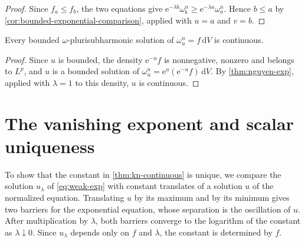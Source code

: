 \begin{proof}
Since $f_a\leq f_b$, the two equations give
$\mathrm{e}^{-\lambda b}\omega_b^n\geq \mathrm{e}^{-\lambda a}\omega_a^n$. Hence $b\leq a$ by \cref{cor:bounded-exponential-comparison}, applied with $u=a$ and $v=b$.
\end{proof}

\begin{corollary}\label{cor:bounded-lp-continuity}
Every bounded $\omega$-plurisubharmonic solution of $\omega_u^n=f\,\mathrm{d}V$ is continuous.
\end{corollary}
\begin{proof}
Since $u$ is bounded, the density $\mathrm{e}^{-u}f$ is nonnegative, nonzero and belongs to $L^p$, and $u$ is a bounded solution of $\omega_u^n=\mathrm{e}^{u}(\mathrm{e}^{-u}f)\,\mathrm{d}V$. By \cref{thm:nguyen-exp}, applied with $\lambda=1$ to this density, $u$ is continuous.
\end{proof}



\section{The vanishing exponent and scalar uniqueness}

To show that the constant in \cref{thm:kn-continuous} is unique, we compare the solution $u_\lambda$ of \eqref{eq:weak-exp} with constant translates of a solution $u$ of the normalized equation. Translating $u$ by its maximum and by its minimum gives two barriers for the exponential equation, whose separation is the oscillation of $u$. After multiplication by $\lambda$, both barriers converge to the logarithm of the constant as $\lambda\downarrow0$. Since $u_\lambda$ depends only on $f$ and $\lambda$, the constant is determined by $f$.

